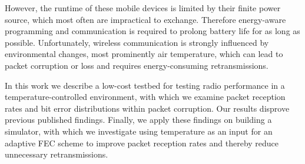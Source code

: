 However, the runtime of these mobile devices is limited by their finite power source, which most often are impractical to exchange.
Therefore energy-aware programming and communication is required to prolong battery life for as long as possible.
Unfortunately, wireless communication is strongly influenced by environmental changes, most prominently air temperature, which can lead to packet corruption or loss and requires energy-consuming retransmissions.

In this work we describe a low-cost testbed for testing radio performance in a temperature-controlled environment, with which we examine packet reception rates and bit error distributions within packet corruption. Our results disprove previous published findings.
Finally, we apply these findings on building a simulator, with which we investigate using temperature as an input for an adaptive \acl{FEC} scheme to improve packet reception rates and thereby reduce unnecessary retransmissions.
